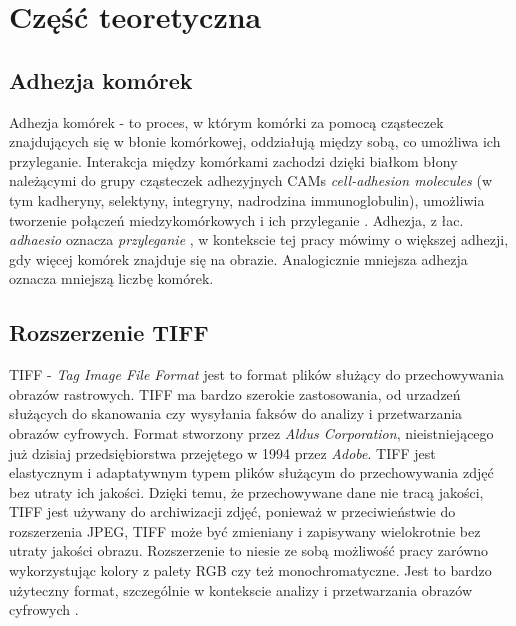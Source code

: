 \documentclass{article}
\begin{document}
    \newpage
    \section{Część teoretyczna}
        \subsection{Adhezja komórek}
        {
            \label{sec:adhezja-komorek}
            \Large
            \justifying
            \quad
            Adhezja komórek - to proces, w którym komórki za pomocą cząsteczek znajdujących się w błonie komórkowej, oddziałują między sobą, co umożliwa ich przyleganie.
            Interakcja między komórkami zachodzi dzięki białkom błony należącymi do grupy cząsteczek adhezyjnych CAMs \textit{cell-adhesion molecules} (w tym kadheryny, selektyny, integryny, nadrodzina immunoglobulin), umożliwia tworzenie połączeń miedzykomórkowych i ich przyleganie
            \cite{Molecular Biology of the Cell. 4th edition}.
            Adhezja, z łac. \textit {adhaesio} oznacza \textit{przyleganie} \cite{adhezja}, w kontekscie tej pracy mówimy o większej adhezji, gdy więcej komórek znajduje się na obrazie.
            Analogicznie mniejsza adhezja oznacza mniejszą liczbę komórek.
        }
        \subsection{Rozszerzenie TIFF}
        {
            \label{sec:rozszerzenie-tiff}
            \Large
            \justifying
            \quad
            TIFF - \textit{Tag Image File Format} jest to format plików służący do przechowywania obrazów rastrowych.
            TIFF ma bardzo szerokie zastosowania, od urzadzeń służących do skanowania czy wysyłania faksów do analizy i przetwarzania obrazów cyfrowych.
            Format stworzony przez \textit{Aldus Corporation}, nieistniejącego już dzisiaj przedsiębiorstwa przejętego w 1994 przez \textit{Adobe}.
            TIFF jest elastycznym i adaptatywnym typem plików służącym do przechowywania zdjęć bez utraty ich jakości.
            Dzięki temu, że przechowywane dane nie tracą jakości, TIFF jest używany do archiwizacji zdjęć, ponieważ w przeciwieństwie do rozszerzenia JPEG,
            TIFF może być zmieniany i zapisywany wielokrotnie bez utraty jakości obrazu.
            Rozszerzenie to niesie ze sobą możliwość pracy zarówno wykorzystując kolory z palety RGB czy też monochromatyczne.
            Jest to bardzo użyteczny format, szczególnie w kontekscie analizy i przetwarzania obrazów cyfrowych \cite{Encyclopedia of Graphics File Formats: The Complete Reference}.
        }
\end{document}
